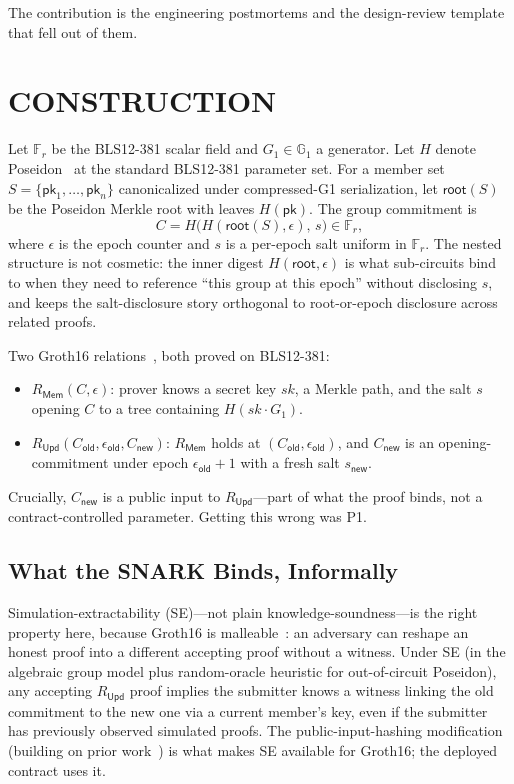 \documentclass{IEEEcsmag}
\newcommand{\Fr}{\mathbb{F}_r}
\newcommand{\Gone}{\mathbb{G}_1}
\newcommand{\Cold}{C_{\mathsf{old}}}
\newcommand{\Cnew}{C_{\mathsf{new}}}
\newcommand{\eold}{\epsilon_{\mathsf{old}}}
\newcommand{\snew}{s_{\mathsf{new}}}
\newcommand{\Rmem}{R_{\mathsf{Mem}}}
\newcommand{\Rupd}{R_{\mathsf{Upd}}}
\begin{document}
The contribution is the engineering postmortems and the design-review template that fell out of them.

\section{CONSTRUCTION}

Let $\Fr$ be the BLS12-381 scalar field and $G_1 \in \Gone$ a generator. Let $H$ denote Poseidon~\cite{grassi2021} at the standard BLS12-381 parameter set. For a member set $S = \{\mathsf{pk}_1, \ldots, \mathsf{pk}_n\}$ canonicalized under compressed-G1 serialization, let $\mathsf{root}(S)$ be the Poseidon Merkle root with leaves $H(\mathsf{pk})$. The group commitment is
\begin{equation}
C = H\!\bigl(H(\mathsf{root}(S), \epsilon),\, s\bigr) \in \Fr,
\end{equation}
where $\epsilon$ is the epoch counter and $s$ is a per-epoch salt uniform in $\Fr$. The nested structure is not cosmetic: the inner digest $H(\mathsf{root}, \epsilon)$ is what sub-circuits bind to when they need to reference ``this group at this epoch'' without disclosing $s$, and keeps the salt-disclosure story orthogonal to root-or-epoch disclosure across related proofs.

Two Groth16 relations~\cite{groth2016}, both proved on BLS12-381:
\begin{itemize}
\item $\Rmem(C, \epsilon)$: prover knows a secret key $sk$, a Merkle path, and the salt $s$ opening $C$ to a tree containing $H(sk \cdot G_1)$.
\item $\Rupd(\Cold, \eold, \Cnew)$: $\Rmem$ holds at $(\Cold, \eold)$, and $\Cnew$ is an opening-commitment under epoch $\eold + 1$ with a fresh salt $\snew$.
\end{itemize}

Crucially, $\Cnew$ is a public input to $\Rupd$---part of what the proof binds, not a contract-controlled parameter. Getting this wrong was P1.

\subsection{What the SNARK Binds, Informally}

Simulation-extractability (SE)---not plain knowledge-soundness---is the right property here, because Groth16 is malleable~\cite{grothmaller2017}: an adversary can reshape an honest proof into a different accepting proof without a witness. Under SE (in the algebraic group model plus random-oracle heuristic for out-of-circuit Poseidon), any accepting $\Rupd$ proof implies the submitter knows a witness linking the old commitment to the new one via a current member's key, even if the submitter has previously observed simulated proofs. The public-input-hashing modification~\cite{baghery2021} (building on prior work~\cite{lipmaa2019}) is what makes SE available for Groth16; the deployed contract uses it.
\end{document}
